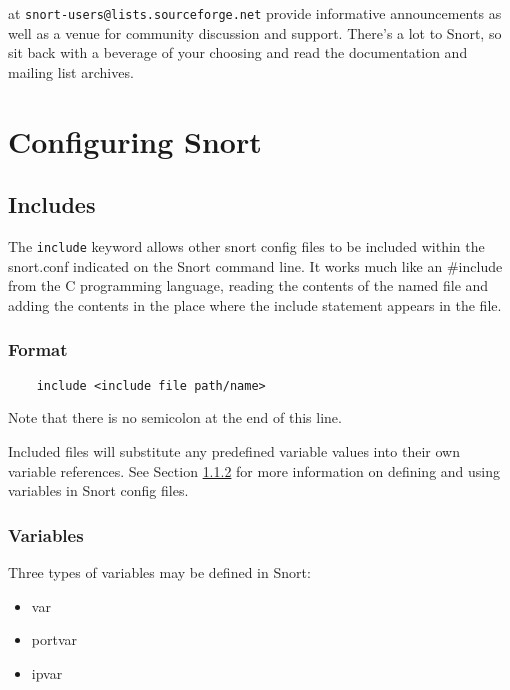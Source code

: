 \documentclass[english]{report}
\newenvironment{note}{
\samepage
    \vspace{10pt}{\textsf{
        {\hspace{7pt}\Huge{$\triangle$\hspace{-12.5pt}{\Large{$^!$}}}}\hspace{5pt}
        {\Large{NOTE}}
    }
    }
   \begin{center}
    \par\vspace{-17pt}

    \begin{lrbox}{\savepar}
    \begin{minipage}[r]{6in}
}
{
    \end{minipage}
    \end{lrbox}
    \fbox{
        \usebox{
            \savepar
	}
    }
    \par\vskip10pt
    \end{center}
}
\newenvironment{note}{
        \begin{rawhtml}
        <p><table border="1"><tr><td><b>
        Note:&nbsp;&nbsp;</b>
        \end{rawhtml}
}{
        \begin{rawhtml}
        </b></td></tr></table></p>
        \end{rawhtml}
}
\begin{document}
at \verb?snort-users@lists.sourceforge.net? provide informative announcements
as well as a venue for community discussion and support. There's a lot to
Snort, so sit back with a beverage of your choosing and read the documentation
and mailing list archives.

\chapter{Configuring Snort}
\label{Configuring Snort}

\section{Includes}

The {\tt include} keyword allows other snort config files to be included within the
snort.conf indicated on the Snort command line. It works much like an \#include
from the C programming language, reading the contents of the named file and
adding the contents in the place where the include statement appears in the
file.

\subsection{Format}
\begin{verbatim}
    include <include file path/name>
\end{verbatim}

\begin{note}

Note that there is no semicolon at the end of this line. 

\end{note}

Included files will substitute any predefined variable values into their own
variable references.  See Section \ref{variables} for more information on
defining and using variables in Snort config files.

\subsection{Variables}
\label{variables}

Three types of variables may be defined in Snort:

\begin{itemize}
\item var
\item portvar
\item ipvar
\end{itemize}
\end{document}
